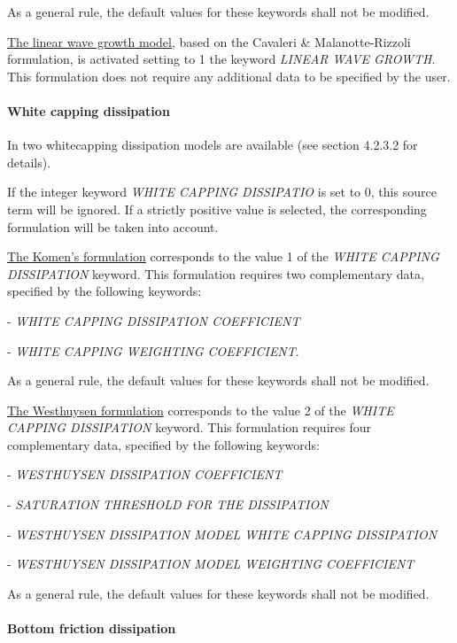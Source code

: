   \textit{}

As a general rule, the default values for these keywords shall not be modified.

\underline{  The linear wave growth model}, based on the Cavaleri \& Malanotte-Rizzoli formulation, is activated setting to 1 the keyword \textit{LINEAR WAVE GROWTH}. This formulation does not require any additional data to be specified by the user.


\paragraph{ White capping dissipation}

 In \tomawac two whitecapping dissipation models are available (see section 4.2.3.2 for details).

 If the integer keyword \textit{WHITE CAPPING DISSIPATIO} is set to 0, this source term will be ignored. If a strictly positive value is selected, the corresponding formulation will be taken into account.

 \underline{  The Komen's formulation} corresponds to the value 1 of the \textit{WHITE CAPPING DISSIPATION} keyword. This formulation requires two complementary data, specified by the following keywords:   

- \textit{WHITE CAPPING DISSIPATION COEFFICIENT}   

- \textit{WHITE CAPPING WEIGHTING COEFFICIENT}.

  \textit{}

 As a general rule, the default values for these keywords shall not be modified.

 \underline{  The Westhuysen formulation} corresponds to the value 2 of the \textit{WHITE CAPPING DISSIPATION} keyword. This formulation requires four complementary data, specified by the following keywords:  

-  \textit{WESTHUYSEN DISSIPATION COEFFICIENT}

-  \textit{SATURATION THRESHOLD FOR THE DISSIPATION}

-  \textit{WESTHUYSEN DISSIPATION MODEL WHITE CAPPING DISSIPATION}

-  \textit{WESTHUYSEN DISSIPATION MODEL WEIGHTING COEFFICIENT}

  \textit{}

As a general rule, the default values for these keywords shall not be modified.

\paragraph{ Bottom friction dissipation}

